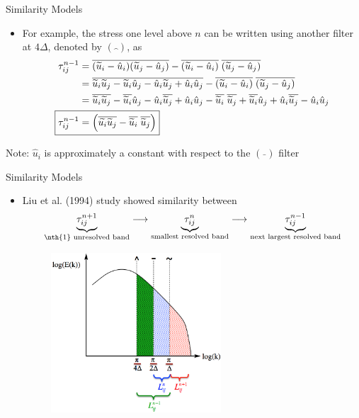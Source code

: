\begin{frame}{Similarity Models}
\begin{itemize}
	\item For example, the stress one level above $n$ can be written using another filter at $4\Delta$, denoted by $(\hat{\ \ })$, as
	\begin{align*}
	\tau_{ij}^{n-1} &= \overline{(\widetilde{u}_i - \hat{u}_i)(\widetilde{u}_j - \hat{u}_j)} - \overline{(\widetilde{u}_i - \hat{u}_i)}\; \overline{(\widetilde{u}_j - \hat{u}_j)}\\
	&= \overline{\widetilde{u}_i\widetilde{u}_j - \widetilde{u}_i\hat{u}_j - \hat{u}_i\widetilde{u}_j + \hat{u}_i\hat{u}_j} - \overline{(\widetilde{u}_i - \hat{u}_i)}\; \overline{(\widetilde{u}_j - \hat{u}_j)}\\
	&= \overline{\widetilde{u}_i\widetilde{u}_j} - \overline{\widetilde{u}_i}\hat{u}_j - \hat{u}_i\overline{\widetilde{u}_j} + \hat{u}_i\hat{u}_j - \overline{\widetilde{u}_i}\; \overline{\widetilde{u}_j} + \overline{\widetilde{u}_i}\hat{u}_j + \hat{u}_i\overline{\widetilde{u}_j} - \hat{u}_i\hat{u}_j\\
	\Aboxed{\tau_{ij}^{n-1}&=\left(\overline{\widetilde{u_i}\widetilde{u}_j} - \overline{\widetilde{u}_i}\; \overline{\widetilde{u}_j}\right)}
	\end{align*}
\end{itemize}
Note: $\hat{u}_i$ is approximately a constant with respect to the $(\bar{\ \ })$ filter

\end{frame}



\begin{frame}{Similarity Models}
\begin{itemize}
	\item Liu et al. (1994) study showed similarity between
	$$\underbrace{\tau_{ij}^{n+1}}_{\text{\nth{1} unresolved band}} \longrightarrow \underbrace{\tau_{ij}^n}_{\text{smallest resolved band}} \longrightarrow \underbrace{\tau_{ij}^{n-1}}_{\text{next largest resolved band}}$$
	\begin{figure}
		\includegraphics[width=0.6\textwidth]{scalesimilarity}
	\end{figure}

\end{itemize}
\end{frame}

